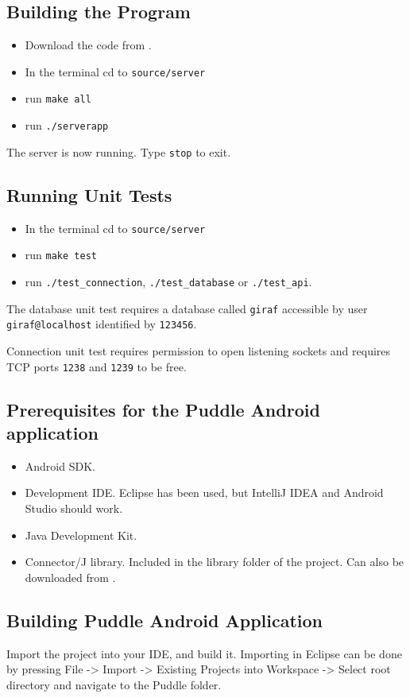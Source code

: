 \subsection{Building the Program}
\begin{itemize}
\item Download the code from \citep{install}.
\item In the terminal cd to \lstinline|source/server|
\item run \lstinline|make all|
\item run \lstinline|./serverapp|
\end{itemize}
The server is now running. Type \lstinline|stop| to exit.

\subsection{Running Unit Tests}
\begin{itemize}
\item In the terminal cd to \lstinline|source/server|
\item run \lstinline|make test|
\item run \lstinline|./test_connection|, \lstinline|./test_database| or 
\lstinline|./test_api|.
\end{itemize}
The database unit test requires a database called \lstinline|giraf| accessible by user \lstinline|giraf@localhost| identified by \lstinline|123456|.

Connection unit test requires permission to open listening sockets and requires TCP ports \lstinline|1238| and \lstinline|1239| to be free.

\subsection{Prerequisites for the Puddle Android application}
\begin{itemize}
\item Android SDK.
\item Development IDE. Eclipse has been used, but IntelliJ IDEA and Android Studio should work.
\item Java Development Kit.
\item Connector/J library. Included in the library folder of the project. Can also be downloaded from \citep{mysqlconnectorj}.
\end{itemize}

\subsection{Building Puddle Android Application}
Import the project into your IDE, and build it. Importing in Eclipse can be done by pressing File -> Import -> Existing Projects into Workspace -> Select root directory and navigate to the Puddle folder.

